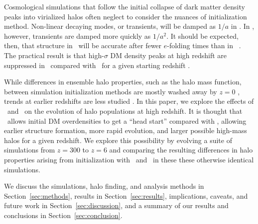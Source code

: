 

Cosmological simulations that follow the initial collapse of dark matter density peaks into virialized halos often neglect to consider the nuances of initialization method.  Non-linear decaying modes, or transients, will be damped as $1 / a$ in \za.  In \lpt, however, transients are damped more quickly as $1 / a^{2}$.  It should be expected, then, that structure in \lpt\ will be accurate after fewer $e$-folding times than in \za\ \citep{1998MNRAS.299.1097S, 2006MNRAS.373..369C, 2010MNRAS.403.1859J}.  The practical result is that high-$\sigma$ DM density peaks at high redshift are suppressed in \za\ compared with \lpt\ for a given starting redshift \citep{2006MNRAS.373..369C}.






While differences in ensemble halo properties, such as the halo mass function, between simulation initialization methods are mostly washed away by $z=0$ \citep{1998MNRAS.299.1097S}, trends at earlier redshifts are less studied \citep{2007ApJ...671.1160L}.  In this paper, we explore the effects of \za\ and \lpt\ on the evolution of halo populations at high redshift.  It is thought that \lpt\ allows initial DM overdensities to get a ``head start'' compared with \za, allowing earlier structure formation, more rapid evolution, and larger possible high-mass halos for a given redshift.  We explore this possibility by evolving a suite of simulations from $z = 300$ to $z = 6$ and comparing the resulting differences in halo properties arising from initialization with \za\ and \lpt\ in these these otherwise identical simulations.

We discuss the simulations, halo finding, and analysis methods in Section~\ref{sec:methods}, results in Section~\ref{sec:results}, implications, caveats, and future work in Section~\ref{sec:discussion}, and a summary of our results and conclusions in Section~\ref{sec:conclusion}.




